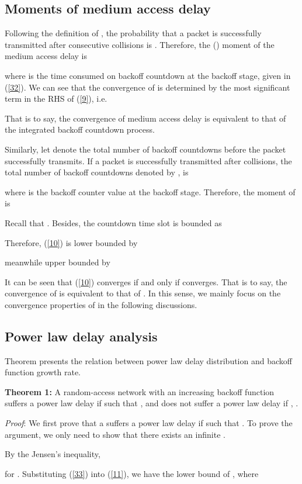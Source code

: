 \documentclass[journal]{IEEEtran}
\begin{document}
\subsection{Moments of medium access delay}
Following the definition of , the probability that a packet is successfully transmitted after  consecutive collisions is . Therefore, the  () moment of the medium access delay  is

where  is the time consumed on backoff countdown at the  backoff stage, given in (\ref{32}). We can see that the convergence of  is determined by the most significant term in the RHS of (\ref{9}), i.e.

That is to say, the convergence of medium access delay is equivalent to that of the integrated backoff countdown process.

Similarly, let  denote the total number of backoff countdowns before the packet successfully transmits. If a packet is successfully transmitted after  collisions, the total number of backoff countdowns denoted by , is

where  is the backoff counter value at the  backoff stage. Therefore, the  moment of  is

Recall that . Besides, the countdown time slot  is bounded as

Therefore, (\ref{10}) is lower bounded by

meanwhile upper bounded by

It can be seen that (\ref{10}) converges if and only if  converges. That is to say, the convergence of  is equivalent to that of . In this sense, we mainly focus on the convergence properties of  in the following discussions.

\subsection{Power law delay analysis}
Theorem  presents the relation between power law delay distribution and backoff function growth rate.

\textbf{Theorem 1:} A random-access network with an increasing backoff function  suffers a power law delay if  such that , and does not suffer a power law delay if , .

\emph{Proof}: We first prove that a  suffers a power law delay if  such that . To prove the argument, we only need to show that there exists an infinite .

By the Jensen's inequality,

for .
Substituting (\ref{33}) into (\ref{11}), we have the lower bound of , where
\end{document}
